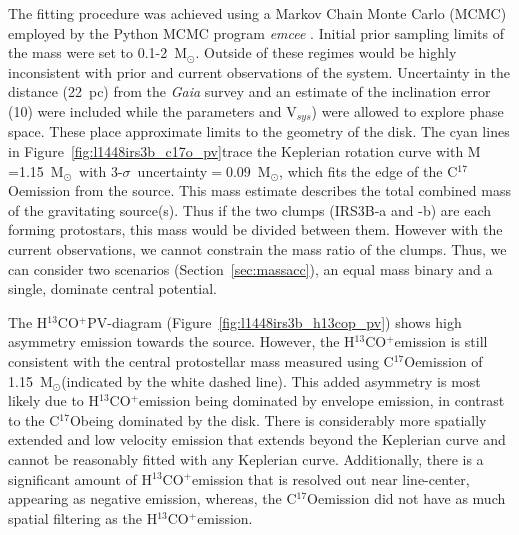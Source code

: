 \documentclass[twocolumn, 12pt]{aastex63}
\newcommand{\cso}{C$^{17}$O}
\newcommand{\htcop}{H$^{13}$CO$^+$}
\renewcommand{\deg}{\degr}
\newcommand{\solm}{M$_{\odot}$}
\begin{document}
The fitting procedure was achieved using a Markov Chain Monte Carlo (MCMC) employed by the Python MCMC program  \textit{emcee} \citep{2013PASP..125..306F}. Initial prior sampling limits of the mass were set to 0.1-2~\solm. Outside of these regimes would be highly inconsistent with prior and current observations of the system. Uncertainty in the distance (22~pc) from the \textit{Gaia} survey \citep[][]{2018arXiv180803499O} and an estimate of the inclination error (10\deg) were included while the parameters  and V$_{sys}$) were allowed to explore phase space. These place approximate limits to the geometry of the disk. The cyan lines in Figure~\ref{fig:l1448irs3b_c17o_pv}\space trace the Keplerian rotation curve with M$_{\*}$=1.15~\solm~with 3-$\sigma$~uncertainty$=0.09$~\solm, which fits the edge of the \cso\space emission from the source. This mass estimate describes the total combined mass of the gravitating source(s). Thus if the two clumps (IRS3B-a and -b) are each forming protostars, this mass would be divided between them. However with the current observations, we cannot constrain the mass ratio of the clumps. Thus, we can consider two scenarios (Section~\ref{sec:massacc}), an equal mass binary and a single, dominate central potential.

The \htcop\space PV-diagram (Figure~\ref{fig:l1448irs3b_h13cop_pv}) shows high asymmetry emission towards the source. However, the \htcop\space emission is still consistent with the central protostellar mass measured using \cso\space emission of 1.15~\solm\space(indicated by the white dashed line). This added asymmetry is most likely due to \htcop\space emission being dominated by envelope emission, in contrast to the \cso\space being dominated by the disk. There is considerably more spatially extended and low velocity emission that extends beyond the Keplerian curve and cannot be reasonably fitted with any Keplerian curve. Additionally, there is a significant amount of \htcop\space emission that is resolved out near line-center, appearing as negative emission, whereas, the \cso\space emission did not have as much spatial filtering as the \htcop\space emission.
\end{document}
